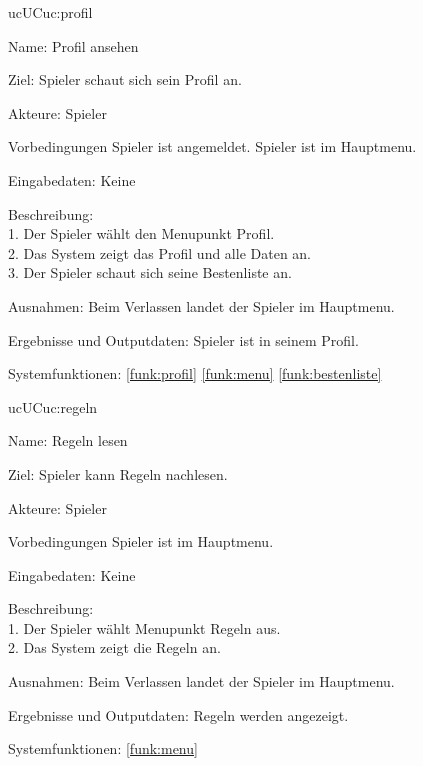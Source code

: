 \begin{description}[leftmargin=5em, style=sameline]
	\begin{lhp}{uc}{UC}{uc:profil}
		\item [Name:] Profil ansehen
		\item [Ziel:] Spieler schaut sich sein Profil an.
		\item [Akteure:] Spieler
		\item [Vorbedingungen] Spieler ist angemeldet. Spieler ist im Hauptmenu.
		\item [Eingabedaten:] Keine
		\item [Beschreibung:] \hfill\\
			1. Der Spieler wählt den Menupunkt Profil.\\
			2. Das System zeigt das Profil und alle Daten an.\\
			3. Der Spieler schaut sich seine Bestenliste an.
		\item [Ausnahmen:] Beim Verlassen landet der Spieler im Hauptmenu.
		\item [Ergebnisse und Outputdaten:] Spieler ist in seinem Profil.
		\item [Systemfunktionen:] \ref{funk:profil} \ref{funk:menu} \ref{funk:bestenliste}
	\end{lhp}

	\begin{lhp}{uc}{UC}{uc:regeln}
		\item [Name:] Regeln lesen
		\item [Ziel:] Spieler kann Regeln nachlesen.
		\item [Akteure:] Spieler
		\item [Vorbedingungen] Spieler ist im Hauptmenu.
		\item [Eingabedaten:] Keine
		\item [Beschreibung:] \hfill\\
				1. Der Spieler wählt Menupunkt Regeln aus.\\
				2. Das System zeigt die Regeln an.
		\item [Ausnahmen:] Beim Verlassen landet der Spieler im Hauptmenu.
		\item [Ergebnisse und Outputdaten:] Regeln werden angezeigt.
		\item [Systemfunktionen:] \ref{funk:menu}
	\end{lhp}


\end{description}
